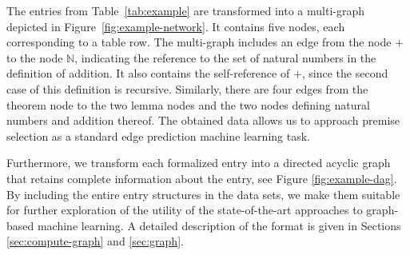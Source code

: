 \documentclass{article}
\begin{document}
The entries from Table~\ref{tab:example} are transformed into a multi-graph depicted in Figure~\ref{fig:example-network}. It contains five nodes, each corresponding to a table row. The multi-graph includes an edge from the node $+$ to the node $\mathbb{N}$, indicating the reference to the set of natural numbers in the definition of addition. It also contains the self-reference of $+$, since the second case of this definition is recursive. Similarly, there are four edges from the theorem node to the two lemma nodes and the two nodes defining natural numbers and addition thereof. The obtained data allows us to approach premise selection as a standard edge prediction machine learning task.

Furthermore, we transform each formalized entry into a directed acyclic graph that retains complete information about the entry, see Figure \ref{fig:example-dag}. By including the entire entry structures in the data sets, we make them suitable for further exploration of the utility of the state-of-the-art approaches to graph-based machine learning. A detailed description of the format is given in Sections \ref{sec:compute-graph} and \ref{sec:graph}.
\end{document}
